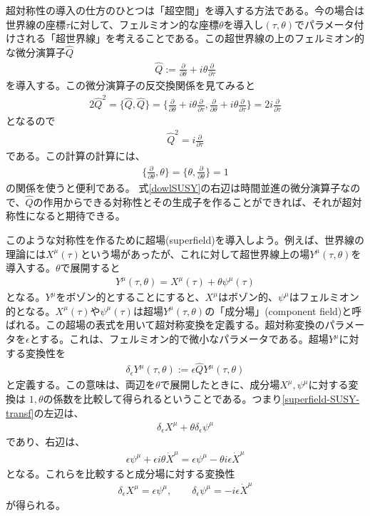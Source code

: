 \documentclass[report,paper=a4, fontsize=12pt, line_length=16cm, number_of_lines=33,dvipdfmx]{jlreq}
\numberwithin{equation}{chapter}
\numberwithin{equation}{section}
\newcommand{\del}{\partial}
\newcommand{\deldel}[2]{\frac{\del {#1}}{\del {#2}}}
\newcommand{\Qh}{\widehat{Q}}
\begin{document}
超対称性の導入の仕方のひとつは「超空間」を導入する方法である。今の場合は世界線の座標$\tau$に対して、フェルミオン的な座標$\theta$を導入し$(\tau,\theta)$でパラメータ付けされる「超世界線」を考えることである。この超世界線の上のフェルミオン的な微分演算子$\Qh$
\begin{align}
\Qh := \deldel{}{\theta} + i \theta \deldel{}{\tau}
\end{align}
を導入する。この微分演算子の反交換関係を見てみると
\begin{align}
2\Qh^2=\{\Qh,\Qh\}=\{\deldel{}{\theta} + i \theta \deldel{}{\tau},\deldel{}{\theta} + i \theta \deldel{}{\tau}\}=2i\deldel{}{\tau}
\end{align}
となるので
\begin{align}
\Qh^2=i\deldel{}{\tau}\label{dowlSUSY}
\end{align}
である。この計算の計算には、
\begin{align}
\{\deldel{}{\theta},\theta\}=\{\theta,\deldel{}{\theta}\}=1
\end{align}
の関係を使うと便利である。
式\eqref{dowlSUSY}の右辺は時間並進の微分演算子なので、$\Qh$の作用からできる対称性とその生成子を作ることができれば、それが超対称性になると期待できる。

このような対称性を作るために超場(superfield)を導入しよう。例えば、世界線の理論には$X^{\mu}(\tau)$という場があったが、これに対して超世界線上の場$Y^{\mu}(\tau,\theta)$を導入する。$\theta$で展開すると
\begin{align}
Y^{\mu}(\tau,\theta)=X^{\mu}(\tau) + \theta \psi^{\mu}(\tau)
\end{align}
となる。$Y^{\mu}$をボゾン的とすることにすると、$X^{\mu}$はボゾン的、$\psi^{\mu}$はフェルミオン的となる。$X^{\mu}(\tau)$や$\psi^{\mu}(\tau)$は超場$Y^{\mu}(\tau,\theta)$の「成分場」(component field)と呼ばれる。この超場の表式を用いて超対称変換を定義する。超対称変換のパラメータを$\epsilon$とする。これは、フェルミオン的で微小なパラメータである。超場$Y^{\mu}$に対する変換性を
\begin{align}
\delta_{\epsilon} Y^{\mu}(\tau,\theta) := \epsilon \Qh Y^{\mu}(\tau,\theta)
\label{superfield-SUSY-transf}
\end{align}
と定義する。この意味は、両辺を$\theta$で展開したときに、成分場$X^{\mu},\psi^{\mu}$に対する変換は
$1, \theta$の係数を比較して得られるということである。つまり\eqref{superfield-SUSY-transf}の左辺は、
\begin{align}
\delta_{\epsilon}X^{\mu} +\theta \delta_{\epsilon} \psi^{\mu}
\end{align}
であり、右辺は、
\begin{align}
\epsilon \psi^{\mu} +\epsilon i\theta \dot{X}^{\mu}
=\epsilon \psi^{\mu} -\theta i\epsilon \dot{X}^{\mu}
\end{align}
となる。これらを比較すると成分場に対する変換性
\begin{align}
\delta_{\epsilon} X^{\mu}=\epsilon \psi^{\mu},\qquad
\delta_{\epsilon} \psi^{\mu}=-i\epsilon \dot{X}^{\mu}
\end{align}
が得られる。
\end{document}
